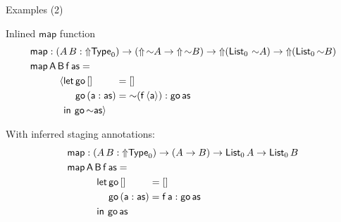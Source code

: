 \documentclass[dvipsnames]{beamer}
\newcommand{\ms}[1]{\mathsf{#1}}
\newcommand{\Type}{\mathsf{Type}}
\newcommand{\Lift}{{\Uparrow}}
\newcommand{\spl}{{\sim}}
\newcommand{\qut}[1]{\langle #1\rangle}
\begin{document}
\begin{frame}{Examples (2)}

\begin{exampleblock}{Inlined $\ms{map}$ function}
\vspace{-1.2em}
  \begin{alignat*}{3}
    & \ms{map} : (A\,B : \Lift \Type_0) \to (\Lift\,\spl A \to \Lift\,\spl B)
                 \to \Lift (\ms{List}_0\,\,\spl A) \to \Lift (\ms{List}_0\,\spl B)\\
    & \ms{map}\,\ms{A}\,\ms{B}\,\ms{f}\,\ms{as} = \\
    & \hspace{3em} \langle \ms{let}\,\ms{go}\,[] \hspace{2.4em}= []\\
    & \hspace{4.6em} \ms{go}\,(\ms{a}:\ms{as}) = \spl{(\ms{f}\,\qut{\ms{a}})} : \ms{go}\,\ms{as}\\
    & \hspace{3.4em}\ms{in}\,\hspace{0.2em}\ms{go}\,\spl{\ms{as}}\rangle
  \end{alignat*}
\end{exampleblock}
\pause
\begin{exampleblock}{With inferred staging annotations:}
\vspace{-1.2em}
  \begin{alignat*}{3}
    & \ms{map} : (A\,B : \Lift \Type_0) \to (A \to B) \to \ms{List}_0\,A \to \ms{List}_0\,B\\
    & \ms{map}\,\ms{A}\,\ms{B}\,\ms{f}\,\ms{as} = \\
    & \hspace{3em} \ms{let}\,\ms{go}\,[] \hspace{2.4em}= []\\
    & \hspace{4.2em} \ms{go}\,(\ms{a}:\ms{as}) = \ms{f}\,\ms{a} : \ms{go}\,\ms{as}\\
    & \hspace{3em}\ms{in}\,\hspace{0.2em}\ms{go}\,\ms{as}
  \end{alignat*}
\end{exampleblock}

\end{frame}
\end{document}
